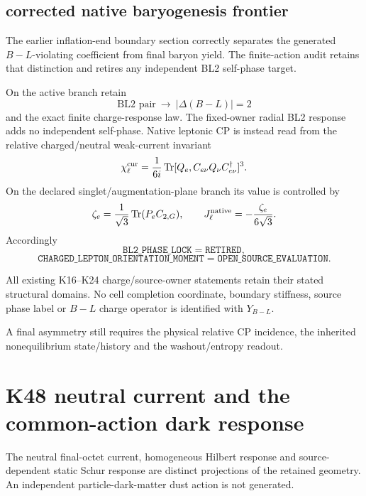 \documentclass[12pt,a4paper]{article}
\begin{document}
\subsection{corrected native baryogenesis frontier}
\label{p8:sec:v2140-baryogenesis-frontier-correction}

The earlier inflation-end boundary section correctly separates the generated
$B-L$-violating coefficient from final baryon yield.  The finite-action audit
retains that distinction and retires any independent BL2 self-phase target.

\begin{proposition}
\label{p8:prop:v2140-corrected-baryogenesis-roles}
On the active branch retain
\[
 \boxed{\text{BL2 pair}\ \longrightarrow\ |\Delta(B-L)|=2}
\]
and the exact finite charge-response law.  The fixed-owner radial BL2 response
adds no independent self-phase.  Native leptonic CP is instead read from the
relative charged/neutral weak-current invariant
\[
 \chi_\ell^{\rm cur}
 =\frac1{6i}\operatorname{Tr}[Q_e,C_{e\nu}Q_\nu C_{e\nu}^\dagger]^3.
\]
On the declared singlet/augmentation-plane branch its value is controlled by
\[
 \zeta_e=\frac1{\sqrt3}\operatorname{Tr}(P_eC_{2,G}),
 \qquad
 J_\ell^{\rm native}=-\frac{\zeta_e}{6\sqrt3}.
\]
Accordingly
\[
 \boxed{\texttt{BL2\_PHASE\_LOCK}=\texttt{RETIRED},}
\]
\[
 \boxed{\texttt{CHARGED\_LEPTON\_ORIENTATION\_MOMENT}
 =\texttt{OPEN\_SOURCE\_EVALUATION}.}
\]
\end{proposition}

\begin{remark}
\label{p8:rem:v2140-k24-not-yield}
\leavevmode\par
All existing K16--K24 charge/source-owner statements retain their stated
structural domains. No cell completion coordinate, boundary stiffness,
source phase label or $B-L$ charge operator is identified with $Y_{B-L}$.

A final asymmetry still requires the physical relative CP incidence,
the inherited nonequilibrium state/history and the washout/entropy readout.
\end{remark}



\section{K48 neutral current and the common-action dark response}
\label{p6a:sec:organized-a6}
The neutral final-octet current, homogeneous Hilbert response and source-dependent static Schur response are distinct projections of the retained geometry. An independent particle-dark-matter dust action is not generated.
\end{document}
